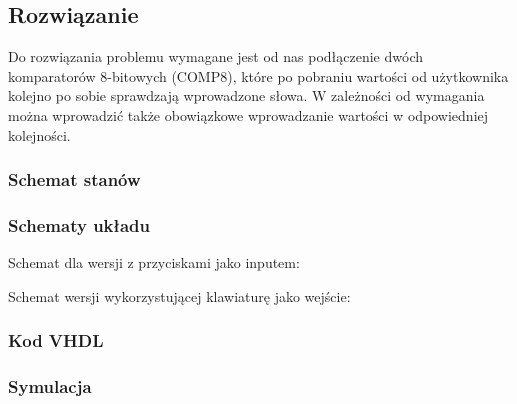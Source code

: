 \documentclass[a4paper,12pt]{extarticle}  %
\begin{document}
\subsection{Rozwiązanie}
Do rozwiązania problemu wymagane jest od nas podłączenie dwóch komparatorów 8-bitowych (COMP8), 
które po pobraniu wartości od użytkownika kolejno po sobie sprawdzają wprowadzone słowa.
W zależności od wymagania można wprowadzić także obowiązkowe wprowadzanie wartości w odpowiedniej kolejności.
\subsubsection{Schemat stanów}
\subsubsection{Schematy układu} %
Schemat dla wersji z przyciskami jako inputem:
\begin{figure}[H]
	\centering
\end{figure}
Schemat wersji wykorzystującej klawiaturę jako wejście:
\subsubsection{Kod VHDL}

\subsubsection{Symulacja}
\begin{figure}[H]
	\centering
\end{figure}
\end{document}

